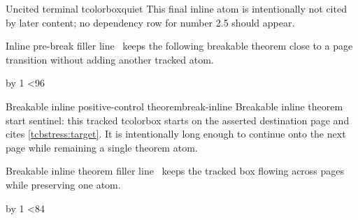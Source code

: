 \documentclass{article}
\begin{document}
\begin{tcbfree}{Uncited terminal tcolorbox}{quiet}
This final inline atom is intentionally not cited by later content; no dependency row for number 2.5 should appear.
\end{tcbfree}

\newcount\codeptcbinlinepreline
{}
\loop
  Inline pre-break filler line \the\codeptcbinlinepreline\ keeps the following breakable theorem close to a page transition without adding another tracked atom.\par
  \advance\codeptcbinlinepreline by 1
\ifnum\codeptcbinlinepreline<96
\repeat

\begin{tcbstress}[breakable]{Breakable inline positive-control theorem}{break-inline}
Breakable inline theorem start sentinel: this tracked tcolorbox starts on the asserted destination page and cites \cref{tcbstress:target}.
It is intentionally long enough to continue onto the next page while remaining a single theorem atom.

\newcount\codeptcbinlineline
{}
\loop
  Breakable inline theorem filler line \the\codeptcbinlineline\ keeps the tracked box flowing across pages while preserving one atom.\par
  \advance\codeptcbinlineline by 1
\ifnum\codeptcbinlineline<84
\repeat
\end{tcbstress}

\END
\end{document}
